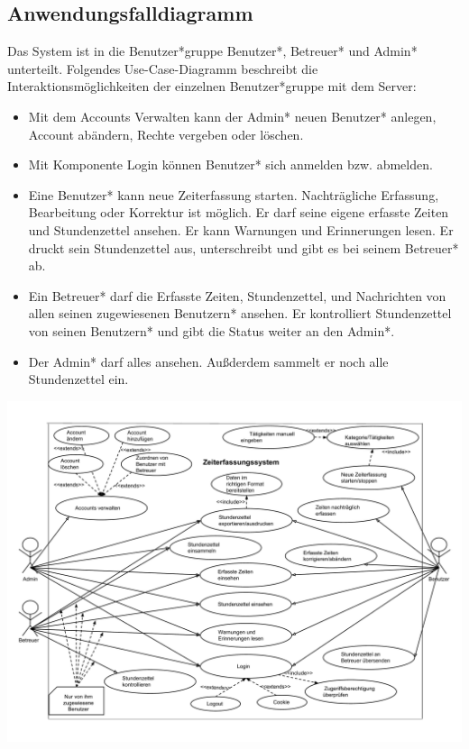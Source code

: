 \newpage
\subsection{Anwendungsfalldiagramm}
Das System ist in die Benutzer*gruppe Benutzer*, Betreuer* und Admin* unterteilt. Folgendes Use-Case-Diagramm beschreibt die Interaktionsmöglichkeiten der einzelnen Benutzer*gruppe mit dem Server:
\begin{itemize}
	\item Mit dem Accounts Verwalten kann der Admin* neuen Benutzer* anlegen, Account abändern, Rechte vergeben oder löschen.
	\item Mit Komponente Login können Benutzer* sich anmelden bzw. abmelden.
	\item Eine Benutzer* kann neue Zeiterfassung starten. Nachträgliche Erfassung, Bearbeitung oder Korrektur ist möglich. Er darf seine eigene erfasste Zeiten und Stundenzettel ansehen. Er kann Warnungen und Erinnerungen lesen. Er druckt sein Stundenzettel aus, unterschreibt und gibt es bei seinem Betreuer* ab.
	\item Ein Betreuer* darf die Erfasste Zeiten, Stundenzettel, und Nachrichten von allen seinen zugewiesenen Benutzern* ansehen. Er kontrolliert Stundenzettel von seinen Benutzern* und gibt die Status weiter an den Admin*.
	\item Der Admin* darf alles ansehen. Außderdem sammelt er noch alle Stundenzettel ein.
\end{itemize}


\includegraphics[width=\linewidth]{Anwendungsfalldiagramm.pdf}\\

